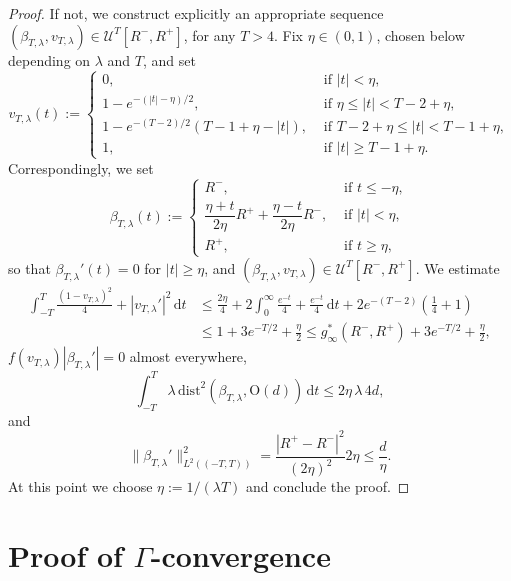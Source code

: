 \documentclass[a4paper,reqno]{amsart}
\newcommand\calU{\mathcal{U}}
\newcommand\dist{{\mathrm{dist}}}
\newcommand\dt{{\,\mathrm{d}t}}
\theoremstyle{remark}
\newcommand{\On}{\mathrm{O}(d)}
\numberwithin{equation}{section}
\begin{document}
\begin{proof}
If not, we construct explicitly an appropriate sequence
 $(\beta_{T,\lambda},v_{T,\lambda})\in \calU^{T}[R^-,R^+]$, for any $T>4$.
Fix $\eta\in (0,1)$, chosen below depending on $\lambda$ and $T$, and set
\begin{equation}
 v_{T,\lambda}(t):=
 \begin{cases}
 0, &\text{ if } |t|<\eta,\\
 1-e^{-(|t|-\eta)/2},
 &\text{ if } \eta\le |t|< T-2+\eta,\\
 1-e^{-(T-2)/2}
 (T-1+\eta-|t|),
 &\text{ if }  T-2+\eta\le |t|< T-1+\eta,\\
 1,
 &\text{ if } |t|\ge T-1+\eta.
 \end{cases}
\end{equation}
Correspondingly, we set
\begin{equation}
 \beta_{T,\lambda}(t):=
 \begin{cases}
  R^-, &\text{ if } t\leq -\eta ,\\
   \dfrac{\eta+t}{2\eta}R^+
  + \dfrac{\eta-t}{2\eta}R^-,&
  \text{ if } |t|< \eta, \\
   R^+,  &\text{ if  } t \geq \eta,
 \end{cases}
\end{equation}
so that $\beta_{T,\lambda}'(t)=0$ for $|t|\ge \eta$, and $(\beta_{T,\lambda}, v_{T,\lambda})\in\mathcal U^T[R^-,R^+]$.
We estimate
\begin{equation}
	\begin{split}
	\int_{-T}^{T} \frac{(1-v_{T,\lambda})^2}4+|v_{T,\lambda}'|^2 \dt
	&\le \frac{2\eta}4+
	2\int_0^\infty \frac{e^{-t}}4 + \frac{e^{-t}}{4}\dt
	+ 2e^{-(T-2)} \left(\frac14+1\right)\\
&	\le 1+3e^{-T/2}+\frac\eta2
	\le g^*_\infty(R^-,R^+)+3e^{-T/2}+\frac\eta2,
	\end{split}
\end{equation}
$ f(v_{T,\lambda})|\beta_{T,\lambda}'|=0$ almost everywhere,
\begin{equation}
 \int_{-T}^T
 \lambda\,  \dist^2(\beta_{T,\lambda},\On)
  \dt
 \le
 2\eta \, \lambda \, 4d,
\end{equation}
and 
\begin{equation}
 \|\beta_{T,\lambda}'\|_{L^2((-T,T))}^2=\frac{|R^+-R^-|^2}{(2\eta)^2}2\eta\le \frac{d}{\eta}.
\end{equation}
At this point we choose $\eta:=1/(\lambda T)$ and conclude the proof.
\end{proof}


\section{Proof of  $\Gamma$-convergence}\label{sec:proofmain}
\end{document}
